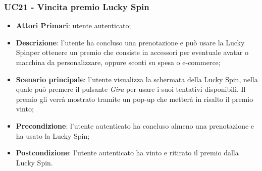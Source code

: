 \subsubsection{UC21 - Vincita premio Lucky Spin}
\begin{itemize}
	\item \textbf{Attori Primari}: utente autenticato;
	\item \textbf{Descrizione}: l'utente ha concluso una prenotazione e può usare la Lucky Spin\glosp per ottenere un premio che consiste in accessori per eventuale avatar o macchina da personalizzare, oppure sconti su spesa o e-commerce;	
	\item \textbf{Scenario principale}: l'utente visualizza la schermata della Lucky Spin, nella quale può premere il pulsante \textit{Gira} per usare i suoi tentativi disponibili. Il premio gli verrà mostrato tramite un pop-up che metterà in risalto il premio vinto;
	\item \textbf{Precondizione}: l'utente autenticato ha concluso almeno una prenotazione e ha usato la Lucky Spin;
	\item \textbf{Postcondizione}: l'utente autenticato ha vinto e ritirato il premio dalla Lucky Spin.
\end{itemize}
